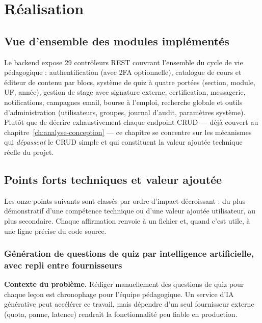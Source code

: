 \chapter{Réalisation}
\label{ch:realisation}

\section{Vue d'ensemble des modules implémentés}

Le backend expose 29 contrôleurs REST couvrant l'ensemble du cycle de vie
pédagogique : authentification (avec 2FA optionnelle), catalogue de cours
et éditeur de contenu par blocs, système de quiz à quatre portées
(section, module, UF, année), gestion de stage avec signature externe,
certification, messagerie, notifications, campagnes email, bourse à
l'emploi, recherche globale et outils d'administration (utilisateurs,
groupes, journal d'audit, paramètres système). Plutôt que de décrire
exhaustivement chaque endpoint CRUD --- déjà couvert au
chapitre~\ref{ch:analyse-conception} --- ce chapitre se concentre sur les
mécanismes qui \emph{dépassent} le CRUD simple et qui constituent la
valeur ajoutée technique réelle du projet.

\section{Points forts techniques et valeur ajoutée}
\label{sec:points-forts}

Les onze points suivants sont classés par ordre d'impact décroissant :
du plus démonstratif d'une compétence technique ou d'une valeur ajoutée
utilisateur, au plus secondaire. Chaque affirmation renvoie à un fichier
et, quand c'est utile, à une ligne précise du code source.

\subsection{Génération de questions de quiz par intelligence artificielle, avec repli entre fournisseurs}
\label{sec:generation-ia}

\textbf{Contexte du problème.} Rédiger manuellement des questions de quiz
pour chaque leçon est chronophage pour l'équipe pédagogique. Un service
d'IA générative peut accélérer ce travail, mais dépendre d'un seul
fournisseur externe (quota, panne, latence) rendrait la fonctionnalité peu
fiable en production.

